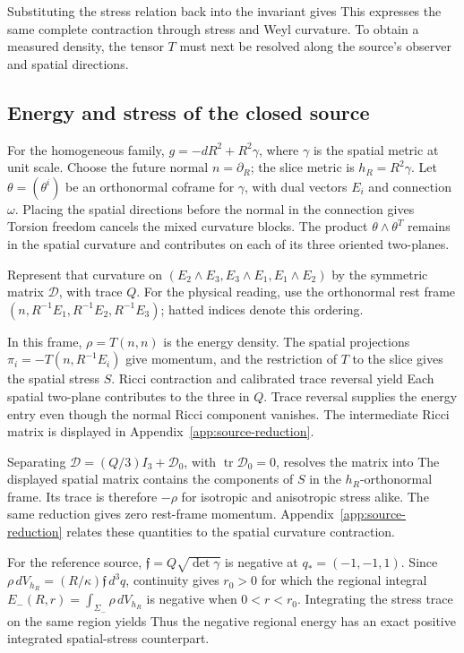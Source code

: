 Substituting the stress relation back into the invariant gives
\NativeEnergyStressDisplay
This expresses the same complete contraction through stress and Weyl curvature. To obtain a measured density, the tensor $T$ must next be resolved along the source's observer and spatial directions.

\subsection{Energy and stress of the closed source}
For the homogeneous family, $g=-dR^2+R^2\gamma$, where $\gamma$ is the spatial metric at unit scale. Choose the future normal $n=\partial_R$; the slice metric is $h_R=R^2\gamma$. Let $\theta=(\theta^i)$ be an orthonormal coframe for $\gamma$, with dual vectors $E_i$ and connection $\omega$. Placing the spatial directions before the normal in the connection gives
\ClosedCurvatureBlockDisplay
Torsion freedom cancels the mixed curvature blocks. The product $\theta\wedge\theta^T$ remains in the spatial curvature and contributes on each of its three oriented two-planes.

Represent that curvature on $(E_2\wedge E_3,E_3\wedge E_1,E_1\wedge E_2)$ by the symmetric matrix $\mathcal D$, with trace $Q$. For the physical reading, use the orthonormal rest frame $(n,R^{-1}E_1,R^{-1}E_2,R^{-1}E_3)$; hatted indices denote this ordering.

In this frame, $\rho=T(n,n)$ is the energy density. The spatial projections $\pi_i=-T(n,R^{-1}E_i)$ give momentum, and the restriction of $T$ to the slice gives the spatial stress $S$. Ricci contraction and calibrated trace reversal yield
\ClosedStressMatrixDisplay
Each spatial two-plane contributes to the three in $Q$. Trace reversal supplies the energy entry even though the normal Ricci component vanishes. The intermediate Ricci matrix is displayed in Appendix~\ref{app:source-reduction}.

Separating $\mathcal D=(Q/3)I_3+\mathcal D_0$, with $\operatorname{tr}\mathcal D_0=0$, resolves the matrix into
\ClosedDensityStressDisplay
The displayed spatial matrix contains the components of $S$ in the $h_R$-orthonormal frame. Its trace is therefore $-\rho$ for isotropic and anisotropic stress alike. The same reduction gives zero rest-frame momentum. Appendix~\ref{app:source-reduction} relates these quantities to the spatial curvature contraction.

For the reference source, $\mathfrak f=Q\sqrt{\det\gamma}$ is negative at $q_*=(-1,-1,1)$. Since $\rho\,dV_{h_R}=(R/\kappa)\mathfrak f\,d^3q$, continuity gives $r_0>0$ for which the regional integral $E_-(R,r)=\int_{\Sigma_-}\rho\,dV_{h_R}$ is negative when $0<r<r_0$. Integrating the stress trace on the same region yields
\ClosedInteriorStressDisplay
Thus the negative regional energy has an exact positive integrated spatial-stress counterpart.
\FloatBarrier
